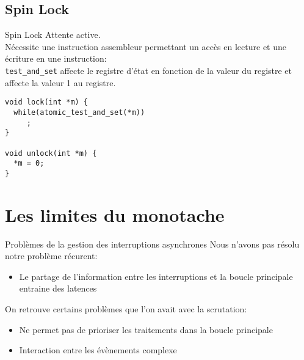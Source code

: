 \subsection{Spin Lock}

\begin{frame}[fragile]{Spin Lock}
  Attente active.\\
  Nécessite une instruction assembleur  permettant un accès en lecture
  et une écriture  en une instruction: \\
  \texttt{test\_and\_set} affecte le registre d'état en fonction de la
  valeur  du registre  et affecte  la valeur  1 au  registre.
  \begin{lstlisting}
void lock(int *m) {
  while(atomic_test_and_set(*m))
     ;
}

void unlock(int *m) {
  *m = 0;
}
  \end{lstlisting}
\end{frame}

\section{Les limites du monotache}

\begin{frame}{Problèmes de la gestion des interruptions asynchrones}
  Nous n'avons pas résolu notre problème récurent:
  \begin{itemize}
  \item  Le partage  de l'information  entre les  interruptions  et la
    boucle principale entraine des latences
  \end{itemize}
  On retrouve certains problèmes que l'on avait avec la scrutation:
  \begin{itemize}
  \item  Ne permet  pas de  prioriser  les traitements  dans la  boucle
    principale
  \item Interaction entre les évènements complexe
  \end{itemize}
\end{frame}

